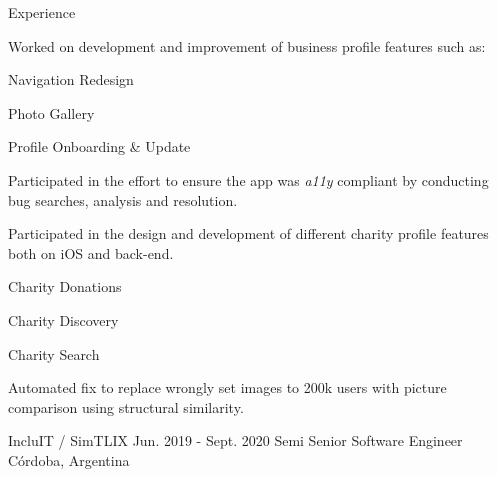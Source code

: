 \documentclass{curriculum}
\begin{document}
\begin{cvsection}{Experience}
\begin{sectionitemlist}
        \item{
            Worked on development and improvement of business profile features such as:
        }{
            \begin{colsectionitemlist}{2}
            \item{Navigation Redesign}
            \item{Photo Gallery}
            \item{Profile Onboarding \& Update}
            \end{colsectionitemlist}
        }

        \item{
            Participated in the effort to ensure the app was \textit{a11y} compliant
            by conducting bug searches, analysis and resolution.
        }

        \item{
            Participated in the design and development of
            different charity profile features both on iOS and back-end.
        }{
            \begin{colsectionitemlist}{3}
            \item{Charity Donations}
            \item{Charity Discovery}
            \item{Charity Search}
            \end{colsectionitemlist}
        }

        \item{
            Automated fix to replace wrongly set images to 200k users with
            picture comparison using structural similarity.
        }

        \end{sectionitemlist}


    \makesectionitemheader
        {IncluIT / SimTLIX}                             {Jun. 2019 - Sept. 2020}
        {Semi Senior Software Engineer}                                {Córdoba, Argentina}

        \begin{sectionitemlist}


\end{sectionitemlist}
\end{cvsection}
\end{document}
